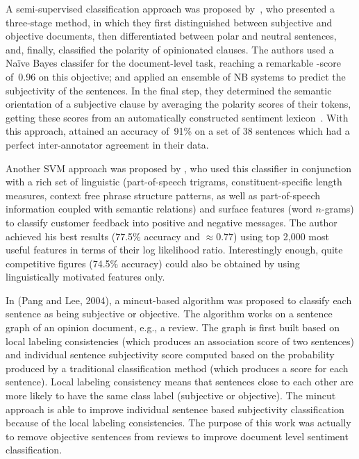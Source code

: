 
A semi-supervised classification approach was proposed
by~\citet{Yu:03}, who presented a three-stage method, in which they
first distinguished between subjective and objective documents, then
differentiated between polar and neutral sentences, and, finally,
classified the polarity of opinionated clauses.  The authors used a
Na{\"i}ve Bayes classifer for the document-level task, reaching a
remarkable \F-score of~0.96 on this objective; and applied an ensemble
of NB systems to predict the subjectivity of the sentences.  In the
final step, they determined the semantic orientation of a subjective
clause by averaging the polarity scores of their tokens, getting these
scores from an automatically constructed sentiment
lexicon~\cite{Hatzivassi:97}.  With this approach, \citeauthor{Yu:03}
attained an accuracy of~91\% on a set of 38 sentences which had a
perfect inter-annotator agreement in their data.


Another SVM approach was proposed by \citet{Gamon:04}, who used this
classifier in conjunction with a rich set of linguistic
(part-of-speech trigrams, constituent-specific length measures,
context free phrase structure patterns, as well as part-of-speech
information coupled with semantic relations) and surface features
(word $n$-grams) to classify customer feedback into positive and
negative messages.  The author achieved his best results (77.5\%
accuracy and $\approx$0.77\F) using top 2,000 most useful features in
terms of their log likelihood ratio.  Interestingly enough, quite
competitive figures (74.5\% accuracy) could also be obtained by using
linguistically motivated features only.




In (Pang and Lee, 2004), a mincut-based algorithm was proposed to
classify each sentence as being subjective or objective. The algorithm
works on a sentence graph of an opinion document, e.g., a review. The
graph is first built based on local labeling consistencies (which
produces an association score of two sentences) and individual
sentence subjectivity score computed based on the probability produced
by a traditional classification method (which produces a score for
each sentence). Local labeling consistency means that sentences close
to each other are more likely to have the same class label (subjective
or objective). The mincut approach is able to improve individual
sentence based subjectivity classification because of the local
labeling consistencies. The purpose of this work was actually to
remove objective sentences from reviews to improve document level
sentiment classification.

